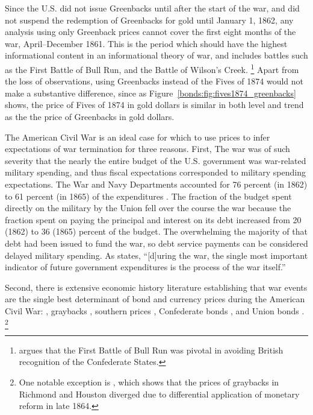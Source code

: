 Since the U.S. did not issue Greenbacks until after the start of the war, and did not suspend the redemption of Greenbacks for gold until January 1, 1862, any analysis using only Greenback prices cannot cover the first eight months of the war, April--December 1861.
This is the period which should have the highest informational content in an informational theory of war, and includes battles such as the First Battle of Bull Run, and the Battle of Wilson's Creek.%
\footnote{\textcite{Poast2012} argues that the First Battle of Bull Run was pivotal in avoiding British recognition of the Confederate States.}
Apart from the loss of observations, using Greenbacks instead of the Fives of 1874 would not make a substantive difference, since as Figure~\ref{bonds:fig:fives1874_greenbacks} shows, the price of Fives of 1874 in gold dollars is similar in both level and trend as the the price of Greenbacks in gold dollars.

The American Civil War is an ideal case for which to use prices to infer expectations of war termination for three reasons.
First, The war was of such severity that the nearly the entire budget of the U.S. government was war-related military spending, and thus fiscal expectations corresponded to military spending expectations. %
The War and Navy Departments accounted for 76 percent (in 1862) to 61 percent (in 1865) of the expenditures \parencites{Treasury1861a}{Treasury1861b}{Treasury1862}{Treasury1863}{Treasury1864}{Treasury1865}.
The fraction of the budget spent directly on the military by the Union fell over the course the war because the fraction spent on paying the principal and interest on its debt increased from 20 (1862) to 36 (1865) percent of the budget.
The overwhelming the majority of that debt had been issued to fund the war, so debt service payments can be considered delayed military spending. 
As \textcite[][668]{McCandless1996} states, ``[d]uring the war, the single most important indicator of future government expenditures is the process of the war itself.''

Second, there is extensive economic history literature establishing that war events are the single best determinant of bond and currency prices during the American Civil War:
\parencites{Mitchell1903}{Mitchell1908}{Calomiris1988}{WillardGuinnaneEtAl1996}{McCandless1996}{SmithSmith1997}, graybacks \parencites{Schwab1901}{Weidenmier2002}, southern prices
\parencite{BurdekinLangdana1993}, Confederate bonds \parencites{DavisPecquet1990}{BrownBurdekin2000}{OosterlinckWeidenmier2007}, and Union bonds \parencite{Roll1972}.%
\footnote{One notable exception is \textcite{BurdekinWeidenmier2001}, which shows that the prices of graybacks in Richmond and Houston diverged due to differential application of monetary reform in late 1864.}

